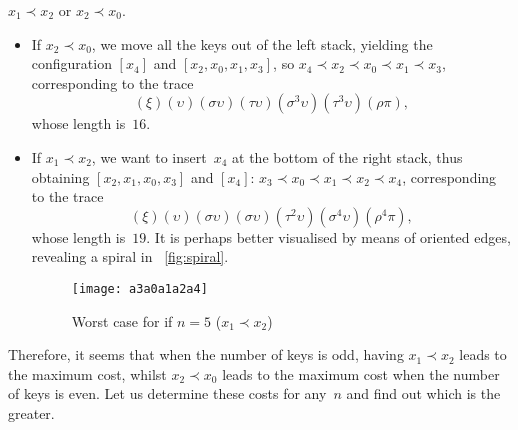 \(x_1 \prec x_2\) or \(x_2 \prec x_0\).
\begin{itemize}

\item If \(x_2 \prec x_0\), we move all the keys out of the left
  stack, yielding the configuration \([x_4]\) and \([x_2, x_0, x_1,
  x_3]\), so \(x_4 \prec x_2 \prec x_0 \prec x_1 \prec x_3\),
  corresponding to the trace
  \begin{equation*}
    (\xi)(\upsilon)(\sigma\upsilon)(\tau\upsilon)(\sigma^3\upsilon)
    (\tau^3\upsilon)(\rho\pi),
  \end{equation*}
  whose length is~\(16\).

\item If \(x_1 \prec x_2\), we want to insert~\(x_4\) at the bottom of
  the right stack, thus obtaining \([x_2, x_1, x_0, x_3]\) and
  \([x_4]\): \(x_3 \prec x_0 \prec x_1 \prec x_2 \prec x_4\),
  corresponding to the trace
  \begin{equation*}
    (\xi)(\upsilon)
  (\sigma\upsilon)(\sigma\upsilon)(\tau^2\upsilon)(\sigma^4\upsilon)
    (\rho^4\pi),
  \end{equation*}
  whose length is~\(19\). It is perhaps better
  visualised by means of oriented edges, revealing a spiral in
  \fig~\vref{fig:spiral}.
    \begin{figure}[h]
      \centering
      \texttt{[image: a3a0a1a2a4]}
      \caption{Worst case for  if \(n=5\) (\(x_1 \prec x_2\))}
      \label{fig:spiral}
    \end{figure}

\end{itemize}
Therefore, it seems that when the number of keys is odd, having \(x_1
\prec x_2\) leads to the maximum cost, whilst \(x_2 \prec x_0\) leads
to the maximum cost when the number of keys is even. Let us determine
these costs for any~\(n\) and find out which is the greater.

